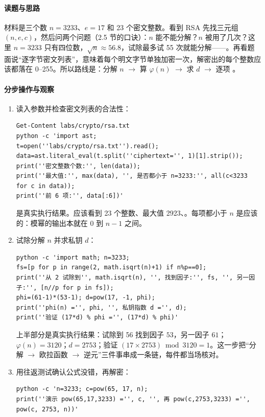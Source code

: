 \documentclass[UTF8,12pt,oneside]{ctexbook}
\begin{document}
\paragraph{读题与思路}材料是三个数 $n = 3233$、$e = 17$ 和 23 个密文整数。看到 RSA 先找三元组 $(n, e, c)$，然后问两个问题（2.5 节的口诀）：$n$ 能不能分解？$n$ 被用了几次？这里 $n = 3233$ 只有四位数，$\sqrt{n} \approx 56.8$，试除最多试 55 次就能分解——。再看题面说“逐字节密文列表”，意味着每个明文字节单独加密一次，解密出的每个整数应该都落在 0--255。所以路线是：分解 $n$ $\to$ 算 $\varphi(n)$ $\to$ 求 $d$ $\to$ 逐项 。

\paragraph{分步操作与观察}
\begin{enumerate}[label=\arabic*.]
\item 读入参数并检查密文列表的合法性：
\begin{lstlisting}
Get-Content labs/crypto/rsa.txt
python -c 'import ast;
t=open(''labs/crypto/rsa.txt'').read();
data=ast.literal_eval(t.split(''ciphertext='', 1)[1].strip());
print(''密文整数个数:'', len(data));
print(''最大值:'', max(data), '', 是否都小于 n=3233:'', all(c<3233 for c in data));
print(''前 6 项:'', data[:6])'
\end{lstlisting}
 是真实执行结果。应该看到 23 个整数、最大值 2923、。每项都小于 $n$ 是应该的：模幂的输出本就在 $0$ 到 $n-1$ 之间。
\item 试除分解 $n$ 并求私钥 $d$：
\begin{lstlisting}
python -c 'import math; n=3233;
fs=[p for p in range(2, math.isqrt(n)+1) if n%p==0];
print(''从 2 试除到'', math.isqrt(n), '', 找到因子:'', fs, '', 另一因子:'', [n//p for p in fs]);
phi=(61-1)*(53-1); d=pow(17, -1, phi);
print(''phi(n) ='', phi, '', 私钥指数 d ='', d);
print(''验证 (17*d) % phi ='', (17*d) % phi)'
\end{lstlisting}
 上半部分是真实执行结果：试除到 56 找到因子 $53$，另一因子 $61$；$\varphi(n) = 3120$；$d = 2753$；验证 $(17 \times 2753) \bmod 3120 = 1$。这一步把“分解 $\to$ 欧拉函数 $\to$ 逆元”三件事串成一条链，每件都当场核对。
\item 用往返测试确认公式没错，再解密：
\begin{lstlisting}
python -c 'n=3233; c=pow(65, 17, n);
print(''演示 pow(65,17,3233) ='', c, '', 再 pow(c,2753,3233) ='', pow(c, 2753, n))'
\end{lstlisting}

\end{enumerate}
\end{document}
